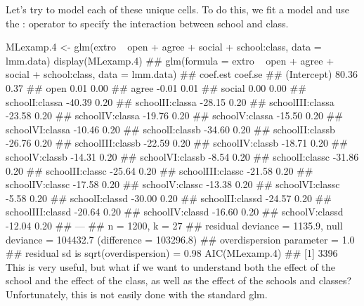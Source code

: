 Let's try to model each of these unique cells. To do this, we fit a model and use the : operator to specify the interaction between school and class.

MLexamp.4 <- glm(extro ~ open + agree + social + school:class, data = lmm.data)
display(MLexamp.4)
## glm(formula = extro ~ open + agree + social + school:class, data = lmm.data)
##                  coef.est coef.se
## (Intercept)       80.36     0.37 
## open               0.01     0.00 
## agree             -0.01     0.01 
## social             0.00     0.00 
## schoolI:classa   -40.39     0.20 
## schoolII:classa  -28.15     0.20 
## schoolIII:classa -23.58     0.20 
## schoolIV:classa  -19.76     0.20 
## schoolV:classa   -15.50     0.20 
## schoolVI:classa  -10.46     0.20 
## schoolI:classb   -34.60     0.20 
## schoolII:classb  -26.76     0.20 
## schoolIII:classb -22.59     0.20 
## schoolIV:classb  -18.71     0.20 
## schoolV:classb   -14.31     0.20 
## schoolVI:classb   -8.54     0.20 
## schoolI:classc   -31.86     0.20 
## schoolII:classc  -25.64     0.20 
## schoolIII:classc -21.58     0.20 
## schoolIV:classc  -17.58     0.20 
## schoolV:classc   -13.38     0.20 
## schoolVI:classc   -5.58     0.20 
## schoolI:classd   -30.00     0.20 
## schoolII:classd  -24.57     0.20 
## schoolIII:classd -20.64     0.20 
## schoolIV:classd  -16.60     0.20 
## schoolV:classd   -12.04     0.20 
## ---
##   n = 1200, k = 27
##   residual deviance = 1135.9, null deviance = 104432.7 (difference = 103296.8)
##   overdispersion parameter = 1.0
##   residual sd is sqrt(overdispersion) = 0.98
AIC(MLexamp.4)
## [1] 3396
This is very useful, but what if we want to understand both the effect of the school and the effect of the class, as well as the effect of the schools and classes? Unfortunately, this is not easily done with the standard glm.

